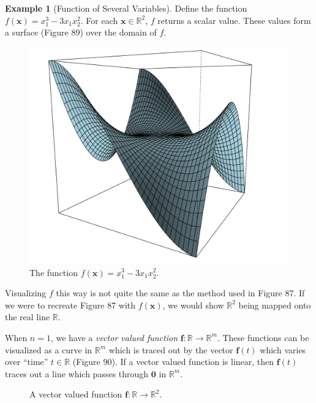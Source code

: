 \documentclass{article}
\newcommand{\R}{\mathbb{R}}
\newcommand{\x}{\mathbf{x}}
\newcommand{\f}{\mathbf{f}}
\newcommand{\ze}{\mathbf{0}}
\theoremstyle{definition}
\newtheorem{example}{Example}[section]
\begin{document}
\begin{example}[Function of Several Variables]
	Define the function $ f(\x)=x_1^3 -3x_1x_2^2 $. For each $ \x\in\R^2 $, $ f $ returns a scalar value. These values form a surface (Figure 89) over the domain of $ f $. 
	\begin{figure}[h!]
		\centering
		\includegraphics[width=0.7\linewidth]{figures/monkey_saddle}
		\caption{The function $ f(\x)= x_1^3 -3x_1x_2^2 $.}
		\label{fig:monkeysaddle}
	\end{figure}
	Visualizing $ f $ this way is not quite the same as the method used in Figure 87. If we were to recreate Figure 87 with $ f(\x) $, we would show $ \R^2 $ being mapped onto the real line $ \R $. 
\end{example}

When $ n = 1 $, we have a \textit{\color{red}vector valued function} $ \f:\R\to\R^m$. These functions can be visualized as a curve in $ \R^m $ which is traced out by the vector $ \f(t) $ which varies over ``time'' $ t\in \R $ (Figure 90). If a vector valued function is linear, then $ \f(t) $ traces out a line which passes through $ \ze $ in $ \R^m $. 

\begin{figure}[h]
	\caption{A vector valued function $ \f:\R\to\R^2 $.}
\end{figure}
\end{document}
